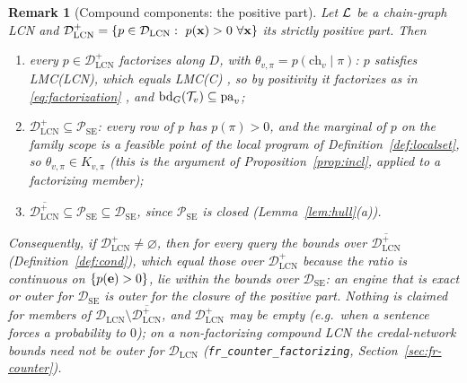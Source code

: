 \documentclass{article} %
\newtheorem{remark}{Remark}
\newcommand{\DSE}{\mathcal{D}_{\mathrm{SE}}}
\newcommand{\DLCN}{\mathcal{D}_{\mathrm{LCN}}}
\newcommand{\ch}{\mathrm{ch}}
\newcommand{\pa}{\mathrm{pa}}
\begin{document}
\begin{remark}[Compound components: the positive part]\label{rem:posclosure}
Let $\mathcal{L}$ be a chain-graph LCN and $\DLCN^{+}=\{p\in\DLCN:\ p(\bx)>0\ \forall\bx\}$
its strictly positive part. Then
\begin{enumerate}
  \item[(a)] every $p\in\DLCN^+$ factorizes along $D$, with
  $\theta_{v,\pi}=p(\ch_v\mid\pi)$: $p$ satisfies LMC(LCN), which equals LMC(C)
  \citep{cozman23a}, so by positivity it factorizes as in
  \eqref{eq:factorization} \citep{cowell99}, and
  $\mathrm{bd}_G(\cT_v)\subseteq\pa_v$;
  \item[(b)] $\DLCN^+\subseteq\mathcal P_{\mathrm{SE}}$: every row of $p$ has
  $p(\pi)>0$, and the marginal of $p$ on the family scope is a feasible point of
  the local program of Definition~\ref{def:localset}, so
  $\theta_{v,\pi}\in K_{v,\pi}$ (this is the argument of
  Proposition~\ref{prop:incl}, applied to a factorizing member);
  \item[(c)] $\overline{\DLCN^+}\subseteq\mathcal P_{\mathrm{SE}}\subseteq\DSE$,
  since $\mathcal P_{\mathrm{SE}}$ is closed (Lemma~\ref{lem:hull}(a)).
\end{enumerate}
Consequently, if $\DLCN^+\neq\varnothing$, then for every query the bounds over
$\overline{\DLCN^+}$ (Definition~\ref{def:cond}), which equal those over
$\DLCN^+$ because the ratio is continuous on $\{p(\mathbf{e})>0\}$, lie within the
bounds over $\DSE$: an engine that is exact or outer for $\DSE$ is outer for the
closure of the positive part. Nothing is claimed for members of
$\DLCN\setminus\overline{\DLCN^+}$, and $\DLCN^+$ may be empty (e.g.\ when a
sentence forces a probability to $0$); on a non-factorizing compound LCN the
credal-network bounds need not be outer for $\DLCN$
(\texttt{fr\_counter\_factorizing}, Section~\ref{sec:fr-counter}).
\end{remark}
\end{document}

